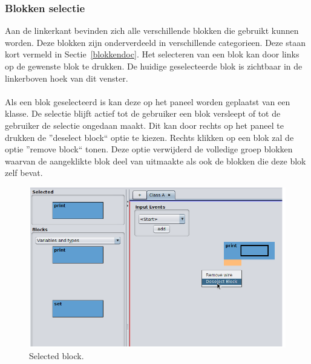 \documentclass[]{article}
\begin{document}
\subsubsection{Blokken selectie}
Aan de linkerkant bevinden zich alle verschillende blokken die gebruikt kunnen worden. Deze blokken zijn onderverdeeld in verschillende categorieen. Deze staan kort vermeld in Sectie~\ref{blokkendoc}. Het selecteren van een blok kan door links op de gewenste blok te drukken. De huidige geselecteerde blok is zichtbaar in de linkerboven hoek van dit venster.\\\\ Als een blok geselecteerd is kan deze op het paneel worden geplaatst van een klasse. De selectie blijft actief tot de gebruiker een blok versleept of tot de gebruiker de selectie ongedaan maakt. Dit kan door rechts op het paneel te drukken de ''deselect block`` optie te kiezen. Rechts klikken op een blok zal de optie ''remove block`` tonen. Deze optie verwijderd de volledige groep blokken waarvan de aangeklikte blok deel van uitmaakte als ook de blokken die deze blok zelf bevat.
\begin{figure}[H]
  \centering
\includegraphics[scale=0.5]{Documentatie/images/select}
  \caption{Selected block.} 
\end{figure}
\end{document}
